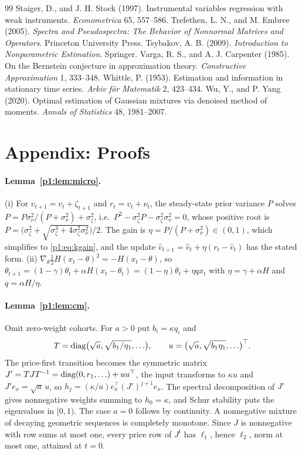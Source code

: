 \begin{thebibliography}{99}
 Staiger, D., and J. H. Stock (1997). Instrumental variables regression with weak instruments. \emph{Econometrica} 65, 557--586.
 Trefethen, L. N., and M. Embree (2005). \emph{Spectra and Pseudospectra: The Behavior of Nonnormal Matrices and Operators}. Princeton University Press.
 Tsybakov, A. B. (2009). \emph{Introduction to Nonparametric Estimation}. Springer.
 Varga, R. S., and A. J. Carpenter (1985). On the Bernstein conjecture in approximation theory. \emph{Constructive Approximation} 1, 333--348.
 Whittle, P. (1953). Estimation and information in stationary time series. \emph{Arkiv f\"or Matematik} 2, 423--434.
 Wu, Y., and P. Yang (2020). Optimal estimation of Gaussian mixtures via denoised method of moments. \emph{Annals of Statistics} 48, 1981--2007.
\end{thebibliography}

\section{Appendix: Proofs}\label{p1:app:proofs}

\paragraph{Lemma~\ref{p1:lem:micro}.} (i) For $v_{t+1}=v_t+\zeta_{t+1}$ and $r_t=v_t+\nu_t$, the steady-state prior variance $P$ solves $P=P\sigma_\nu^2/(P+\sigma_\nu^2)+\sigma_\zeta^2$, i.e.\ $P^2-\sigma_\zeta^2P-\sigma_\zeta^2\sigma_\nu^2=0$, whose positive root is $P=\bigl(\sigma_\zeta^2+\sqrt{\sigma_\zeta^4+4\sigma_\zeta^2\sigma_\nu^2}\bigr)/2$. The gain is $\eta=P/(P+\sigma_\nu^2)\in(0,1)$, which simplifies to \eqref{p1:eq:kgain}, and the update $\hat v_{t+1}=\hat v_t+\eta(r_t-\hat v_t)$ has the stated form. (ii) $\nabla_\theta\tfrac12H(x_t-\theta)^2=-H(x_t-\theta)$, so $\theta_{t+1}=(1-\gamma)\theta_t+\alpha H(x_t-\theta_t)=(1-\eta)\theta_t+\eta qx_t$ with $\eta=\gamma+\alpha H$ and $q=\alpha H/\eta$.

\paragraph{Lemma~\ref{p1:lem:cm}.} Omit zero-weight cohorts. For $a>0$ put $b_i=\kappa q_i$ and
\[
T={\rm diag}\bigl(\sqrt a,\sqrt{b_1/\eta_1},\ldots\bigr),\qquad u=\bigl(\sqrt a,\sqrt{b_1\eta_1},\ldots\bigr)^\top .
\]
The price-first transition becomes the symmetric matrix $J'=TJT^{-1}={\rm diag}(0,r_1,\ldots)+uu^\top$, the input transforms to $\kappa u$ and $J'e_x=\sqrt a\,u$, so $h_j=(\kappa/a)e_x^\top(J')^{j+1}e_x$. The spectral decomposition of $J'$ gives nonnegative weights summing to $h_0=\kappa$, and Schur stability puts the eigenvalues in $[0,1)$. The case $a=0$ follows by continuity. A nonnegative mixture of decaying geometric sequences is completely monotone. Since $J$ is nonnegative with row sums at most one, every price row of $J^t$ has $\ell_1$, hence $\ell_2$, norm at most one, attained at $t=0$.

